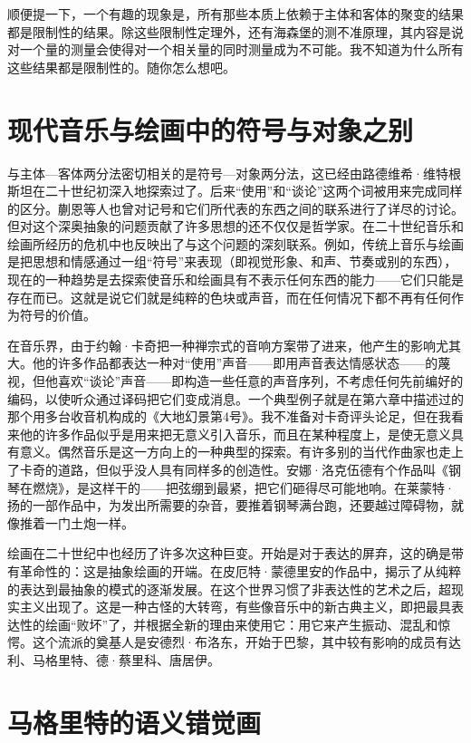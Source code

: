 顺便提一下，一个有趣的现象是，所有那些本质上依赖于主体和客体的聚变的结果都是限制性的结果。除这些限制性定理外，还有海森堡的测不准原理，其内容是说对一个量的测量会使得对一个相关量的同时测量成为不可能。我不知道为什么所有这些结果都是限制性的。随你怎么想吧。

\section{现代音乐与绘画中的符号与对象之别}

与主体—客体两分法密切相关的是符号—对象两分法，这已经由路德维希·维特根斯坦在二十世纪初深入地探索过了。后来“使用”和“谈论”这两个词被用来完成同样的区分。蒯恩等人也曾对记号和它们所代表的东西之间的联系进行了详尽的讨论。但对这个深奥抽象的问题贡献了许多思想的还不仅仅是哲学家。在二十世纪音乐和绘画所经历的危机中也反映出了与这个问题的深刻联系。例如，传统上音乐与绘画是把思想和情感通过一组“符号”来表现（即视觉形象、和声、节奏或别的东西），现在的一种趋势是去探索使音乐和绘画具有不表示任何东西的能力——它们只能是存在而已。这就是说它们就是纯粹的色块或声音，而在任何情况下都不再有任何作为符号的价值。

在音乐界，由于约翰·卡奇把一种禅宗式的音响方案带了进来，他产生的影响尤其大。他的许多作品都表达一种对“使用”声音——即用声音表达情感状态——的蔑视，但他喜欢“谈论”声音——即构造一些任意的声音序列，不考虑任何先前编好的编码，以使听众通过译码把它们变成消息。一个典型例子就是在第六章中描述过的那个用多台收音机构成的《大地幻景第4号》。我不准备对卡奇评头论足，但在我看来他的许多作品似乎是用来把无意义引入音乐，而且在某种程度上，是使无意义具有意义。偶然音乐是这一方向上的一种典型的探索。有许多别的当代作曲家也走上了卡奇的道路，但似乎没人具有同样多的创造性。安娜·洛克伍德有个作品叫《钢琴在燃烧》，是这样干的——把弦绷到最紧，把它们砸得尽可能地响。在莱蒙特·扬的一部作品中，为发出所需要的杂音，要推着钢琴满台跑，还要越过障碍物，就像推着一门土炮一样。

绘画在二十世纪中也经历了许多次这种巨变。开始是对于表达的屏弃，这的确是带有革命性的：这是抽象绘画的开端。在皮厄特·蒙德里安的作品中，揭示了从纯粹的表达到最抽象的模式的逐渐发展。在这个世界习惯了非表达性的艺术之后，超现实主义出现了。这是一种古怪的大转弯，有些像音乐中的新古典主义，即把最具表达性的绘画“败坏”了，并根据全新的理由来使用它：用它来产生振动、混乱和惊愕。这个流派的奠基人是安德烈·布洛东，开始于巴黎，其中较有影响的成员有达利、马格里特、德·蔡里科、唐居伊。

\section{马格里特的语义错觉画}

